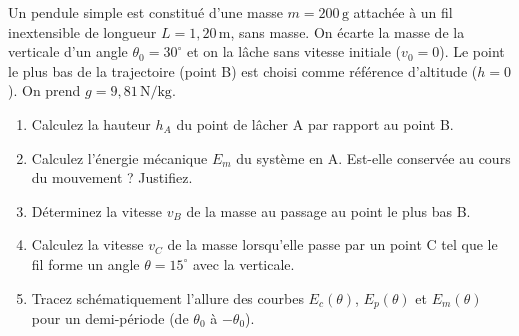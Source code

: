 \documentclass[11pt]{article}
\begin{document}
\begin{exercice}
Un pendule simple est constitué d'une masse $m = 200\,\text{g}$ attachée à un fil inextensible de longueur $L = 1,20\,\text{m}$, sans masse. On écarte la masse de la verticale d'un angle $\theta_0 = 30^\circ$ et on la lâche sans vitesse initiale ($v_0 = 0$). Le point le plus bas de la trajectoire (point B) est choisi comme référence d'altitude ($h=0$). On prend $g = 9,81\,\text{N/kg}$.
\begin{enumerate}
    \item Calculez la hauteur $h_A$ du point de lâcher A par rapport au point B.
    \item Calculez l'énergie mécanique $E_m$ du système en A. Est-elle conservée au cours du mouvement ? Justifiez.
    \item Déterminez la vitesse $v_B$ de la masse au passage au point le plus bas B.
    \item Calculez la vitesse $v_C$ de la masse lorsqu'elle passe par un point C tel que le fil forme un angle $\theta = 15^\circ$ avec la verticale.
    \item Tracez schématiquement l'allure des courbes $E_c(\theta)$, $E_p(\theta)$ et $E_m(\theta)$ pour un demi-période (de $\theta_0$ à $-\theta_0$).
\end{enumerate}
\end{exercice}
\end{document}
